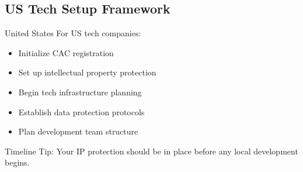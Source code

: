 \subsection{US Tech Setup Framework}\label{subsec:us-setup}
\begin{regionalbox}{United States}
For US tech companies:
\begin{itemize}
    \item Initialize CAC registration
    \item Set up intellectual property protection
    \item Begin tech infrastructure planning
    \item Establish data protection protocols
    \item Plan development team structure
\end{itemize}

Timeline Tip: Your IP protection should be in place before any local development begins.

%
\end{regionalbox}

